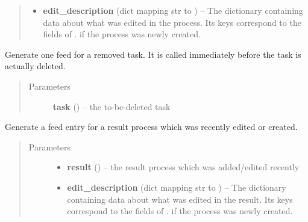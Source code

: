 \documentclass[a4paper,11pt,english]{sphinxmanual}
\begin{document}
\begin{fulllineitems}
\begin{fulllineitems}
\begin{quote}
\begin{description}
\begin{itemize}
\item {} 
\textbf{edit\_description} (dict mapping str to ) -- The dictionary containing data about what was
edited in the process.  Its keys correspond to the fields of
{\hyperref[programming/utilities:samples.utils.views.EditDescriptionForm]{}}.   if the
process was newly created.

\end{itemize}

\end{description}\end{quote}

\end{fulllineitems}


\begin{fulllineitems}
\label{programming/utilities:samples.utils.views.Reporter.report_removed_task}
Generate one feed for a removed task.  It is called immediately
before the task is actually deleted.
\begin{quote}\begin{description}
\item[{Parameters}] \leavevmode
\textbf{task} () -- the to-be-deleted task

\end{description}\end{quote}

\end{fulllineitems}


\begin{fulllineitems}
\label{programming/utilities:samples.utils.views.Reporter.report_result_process}
Generate a feed entry for a result process which was recently
edited or created.
\begin{quote}\begin{description}
\item[{Parameters}] \leavevmode\begin{itemize}
\item {} 
\textbf{result} () -- the result process which was added/edited recently

\item {} 
\textbf{edit\_description} (dict mapping str to ) -- The dictionary containing data about what was
edited in the result.  Its keys correspond to the fields of
{\hyperref[programming/utilities:samples.utils.views.EditDescriptionForm]{}}.   if the
process was newly created.


\end{itemize}
\end{description}
\end{quote}
\end{fulllineitems}
\end{fulllineitems}
\end{document}
